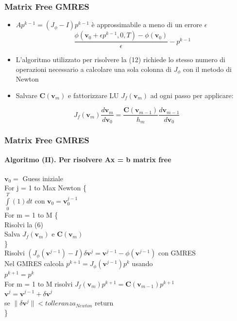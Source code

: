 \documentclass[10pt]{beamer}
\begin{document}
\begin{frame}
\frametitle{Matrix Free GMRES}
\begin{itemize}
\item $Ap^{k-1} = (J_\phi - I)p^{k-1}$ è approssimabile a meno di un errore $\epsilon$ \\\begin{equation} \frac{\phi(\mathbf{v}_0 + \epsilon p^{k-1},0,T) - \phi (\mathbf{v}_0)}{\epsilon} - p^{k-1}
\tag{12}
\end{equation}
\item L'algoritmo utilizzato per risolvere la (12) richiede lo stesso numero di operazioni necessario a calcolare una sola colonna di $J_\phi$ con il metodo di Newton
\item Salvare $\mathbf{C}(\mathbf{v}_m)$ e fattorizzare LU $J_f(\mathbf{v}_m)$ ad ogni passo per applicare:
\end{itemize}
\begin{equation}
J_f(\mathbf{v}_m)\frac{d\mathbf{v}_m}{d\mathbf{v}_0} = \frac{\mathbf{C}(\mathbf{v}_{m-1})}{h_m}\frac{d\mathbf{v}_{m-1}}{d\mathbf{v}_0}
\tag{11}
\end{equation}  
\end{frame}


\begin{frame}
\frametitle{Matrix Free GMRES}\framesubtitle{\textbf{Algoritmo (II)}. Per risolvere Ax = b matrix free}

$\mathbf{v}_0 =$ Guess iniziale \\
 For j = 1 to Max Newton \{ \\
 $\int\limits_{0}^{T} (1) dt$ con $\mathbf{v}_0 = \mathbf{v}_0^{j-1}$ \\
 For m = 1 to M \{ \\
 Risolvi la (6) \\
 Salva $J_f(\mathbf{v}_m)$ e $\mathbf{C}(\mathbf{v}_m)$ \\
 \}\\
 Risolvi $(J_\phi(\mathbf{v}^{j-1}) - I)\delta\mathbf{v}^j = \mathbf{v}^{j-1} - \phi(\mathbf{v}^{j-1})$ con GMRES\\
 Nel GMRES calcola $p^{k+1} = J_\phi(\mathbf{v}^{j-1})p^k$ usando\\
 $p^{k+1} = p^k$ \\
 For m = 1 to M risolvi $J_f(\mathbf{v}_m)p^{k+1} = \mathbf{C}(\mathbf{v}_{m-1})p^{k+1}$ \\
 
 $\mathbf{v}^j = \mathbf{v}^{j-1} + \delta\mathbf{v}^j$ \\
 se $\|\delta\mathbf{v}^j\| < tolleranza_{Newton}$ return\\
 \}

\end{frame}
\end{document}
